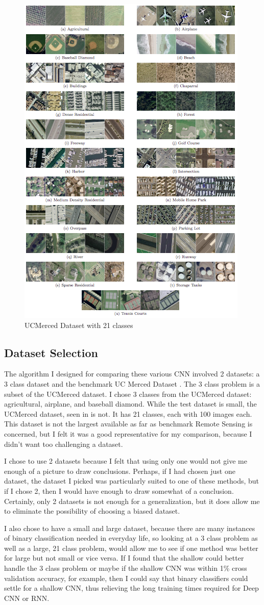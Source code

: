 \documentclass[12pt]{article}
\begin{document}
	\begin{figure}[t!]
		\centering
		\includegraphics[width=0.5\linewidth]{img/ucm.png}
		\caption{UCMerced Dataset with 21 classes}
		\label{fig:ucm}
	\end{figure}
	
	\subsection{Dataset Selection}
The algorithm I designed for comparing these various CNN involved 2 datasets: a 3 class dataset and the benchmark UC Merced Dataset \cite{ucm}. The 3 class problem is a subset of the UCMerced dataset. I chose 3 classes from the UCMerced dataset: agricultural, airplane, and baseball diamond. While the test dataset is small, the UCMerced dataset, seen in  is not. It has 21 classes, each with 100 images each. This dataset is not the largest available as far as benchmark Remote Sensing is concerned, but I felt it was a good representative for my comparison, because I didn't want too challenging a dataset. 

I chose to use 2 datasets because I felt that using only one would not give me enough of a picture to draw conclusions. Perhaps, if I had chosen just one dataset, the dataset I picked was particularly suited to one of these methods, but if I chose 2, then I would have enough to draw somewhat of a conclusion. Certainly, only 2 datasets is not enough for a generalization, but it does allow me to eliminate the possibility of choosing a biased dataset.

I also chose to have a small and large dataset, because there are many instances of binary classification needed in everyday life, so looking at a 3 class problem as well as a large, 21 class problem, would allow me to see if one method was better for large but not small or vice versa. If I found that the shallow could better handle the 3 class problem or maybe if the shallow CNN was within 1\% cross validation accuracy, for example, then I could say that binary classifiers could settle for a shallow CNN, thus relieving the long training times required for Deep CNN or RNN. 
\end{document}
